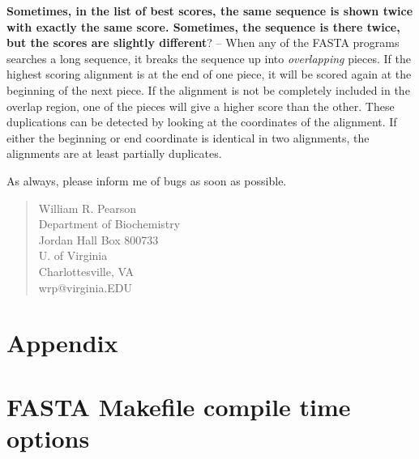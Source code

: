 \documentclass[11pt]{article}
\begin{document}
\vspace{0.5ex}
{\noindent}\textbf{Sometimes, in the list of best scores, the same sequence is
  shown twice with exactly the same score.  Sometimes, the sequence is
  there twice, but the scores are slightly different}? -- When any of
the FASTA programs searches a long sequence, it breaks the sequence up
into \emph{overlapping} pieces.  If the highest scoring alignment is
at the end of one piece, it will be scored again at the beginning of
the next piece.  If the alignment is not be completely included in the
overlap region, one of the pieces will give a higher score than the
other.  These duplications can be detected by looking at the
coordinates of the alignment.  If either the beginning or end
coordinate is identical in two alignments, the alignments are at least
partially duplicates.

\vspace{2ex}
As always, please inform me of bugs as soon as possible.

\begin{quote}
William R. Pearson\\
Department of Biochemistry\\
Jordan Hall Box 800733\\
U. of Virginia\\
Charlottesville, VA\\
wrp@virginia.EDU
\end{quote}




\appendix
\section*{Appendix}

\section{FASTA Makefile compile time options}
\end{document}
